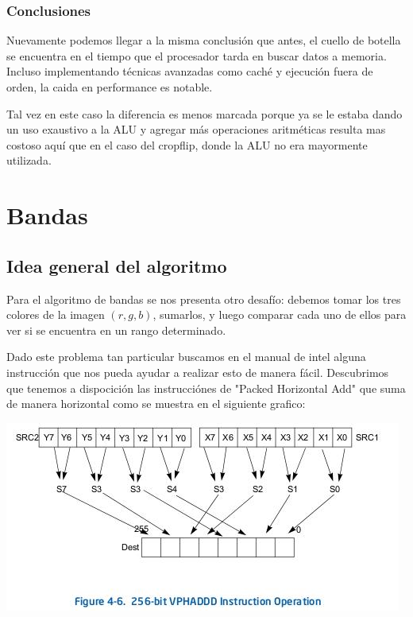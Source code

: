 \documentclass[a4paper]{article}
\begin{document}
\subsubsection{Conclusiones}

Nuevamente podemos llegar a la misma conclusión que antes, el cuello de botella se encuentra en el tiempo que el procesador tarda en buscar datos a memoria. Incluso implementando técnicas avanzadas como caché y ejecución fuera de orden, la caida en performance es notable.

Tal vez en este caso la diferencia es menos marcada porque ya se le estaba dando un uso exaustivo a la ALU y agregar más operaciones aritméticas resulta mas costoso aquí que en el caso del cropflip, donde la ALU no era mayormente utilizada.

\newpage
\section{Bandas}
\subsection{Idea general del algoritmo}
Para el algoritmo de bandas se nos presenta otro desafío: debemos tomar los tres colores de la imagen $(r,g,b)$, sumarlos, y luego comparar cada uno de ellos para ver si se encuentra en un rango determinado.

Dado este problema tan particular buscamos en el manual de intel alguna instrucción que nos pueda ayudar a realizar esto de manera fácil. Descubrimos que tenemos a dispocición las instrucciónes de "Packed Horizontal Add" que suma de manera horizontal como se muestra en el siguiente grafico:

\begin{center}
\includegraphics[scale=0.66]{Dibujos/SH.jpg}
\end{center}
\end{document}
